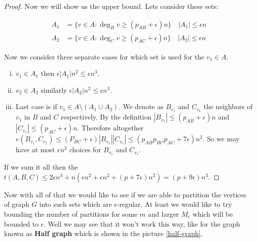 \begin{proof}
	Now we will show us the upper bound. Lets consider these sets:
	
	$$
	\begin{aligned}
		A_1 &= \{ v \in A : \deg_B v \geq (p_{AB} + \epsilon) n\} \quad |A_1| \leq \epsilon n \\
		A_2 &= \{ v \in A : \deg_C v \geq (p_{AC} + \epsilon) n\} \quad |A_2| \leq \epsilon n
	\end{aligned}
	$$
	
	Now we consider three separate cases for which set is used for the $v_1 \in A$.
	
	\begin{enumerate}[(i)]
		\item $v_1 \in A_1$ then $\epsilon |A_1| n^2 \leq \epsilon n^3$.
		\item $v_2 \in A_2$ similarly $\epsilon |A_2| n^2 \leq \epsilon n^3$.
		\item Last case is if $v_1 \in A \setminus (A_1 \cup A_2)$. We denote as $B_{v_1}$ and $C_{v_1}$ the neighbors of $v_1$ in $B$ and $C$ respectively. By the definition $|B_{v_1}| \leq (p_{AB} + \epsilon) n$ and  $|C_{v_1}| \leq (p_{AC} + \epsilon) n$. Therefore altogether $e(B_{v_1}, C_{v_1}) \leq (P_{BC} +\epsilon) |B_{v_1}| |C_{v_1}| \leq (p_{AB} p_{BC} p_{AC} + 7\epsilon) n^2$. So we may have at most $\epsilon n^2$ choices for $B_{v_1}$ and $C_{v_1}$.
	\end{enumerate}
	
	If we sum it all then the $t(A,B,C) \leq 2\epsilon n^3 + n (\epsilon n^2 + \epsilon n^2 + (p  + 7\epsilon)n^2) = (p + 9 \epsilon)n^3$.
\end{proof}

Now with all of that we would like to see if we are able to partition the vertices of graph $G$ into such sets which are $\epsilon$-regular. At least we would like to try bounding the number of partitions for some $m$ and larger $M_\epsilon$ which will be bounded to $\epsilon$. Well we may see that it won't work this way, like for the graph known as \textbf{Half graph} which is shown in the picture \ref{half-graph}.

